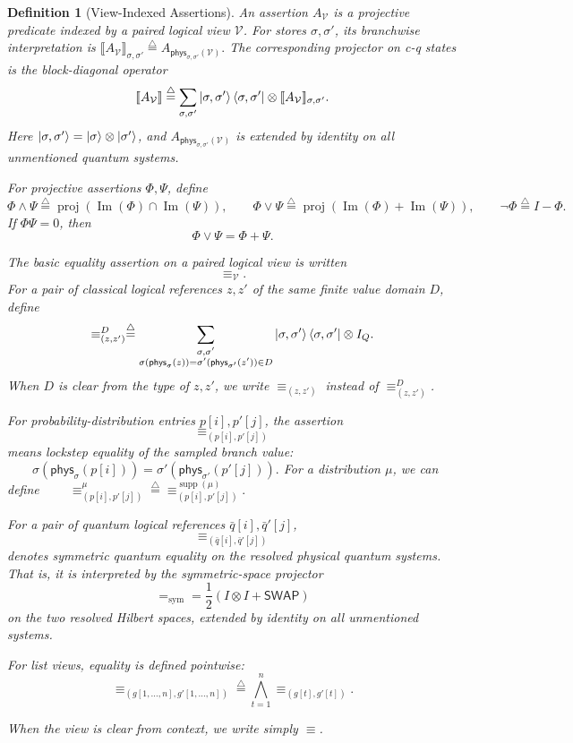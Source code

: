 \documentclass[acmsmall,screen,review,anonymous,nonacm]{acmart}
\newtheorem{definition}{Definition}[section]
\theoremstyle{defn_style}
\begin{document}
\begin{definition}[View-Indexed Assertions]
An assertion \(A_{\mathcal V}\) is a projective predicate indexed by a paired
logical view \(\mathcal V\). For stores \(\sigma,\sigma'\), its branchwise
interpretation is
\(\llbracket A_{\mathcal V}\rrbracket_{\sigma,\sigma'}
\stackrel{\triangle}{=}
A_{\mathsf{phys}_{\sigma,\sigma'}(\mathcal V)}.\)
The corresponding projector on c-q states is the block-diagonal operator
\[
\llbracket A_{\mathcal V}\rrbracket
\stackrel{\triangle}{=}
\sum_{\sigma,\sigma'}
\ket{\sigma,\sigma'}\bra{\sigma,\sigma'}
\otimes
\llbracket A_{\mathcal V}\rrbracket_{\sigma,\sigma'}.
\]
Here
\(\ket{\sigma,\sigma'}=\ket{\sigma}\otimes\ket{\sigma'}\), and
\(A_{\mathsf{phys}_{\sigma,\sigma'}(\mathcal V)}\) is extended by identity
on all unmentioned quantum systems.

For projective assertions \(\Phi,\Psi\), define
\[
\Phi\land\Psi
\stackrel{\triangle}{=}
\operatorname{proj}
\left(
\operatorname{Im}(\Phi)\cap\operatorname{Im}(\Psi)
\right),
\qquad
\Phi\lor\Psi
\stackrel{\triangle}{=}
\operatorname{proj}
\left(
\operatorname{Im}(\Phi)+\operatorname{Im}(\Psi)
\right),
\qquad
\neg\Phi\stackrel{\triangle}{=}I-\Phi.
\]
If \(\Phi\Psi=0\), then
\[
\Phi\lor\Psi=\Phi+\Psi.
\]

The basic equality assertion on a paired logical view is written
\[
\equiv_{\mathcal V}.
\]
For a pair of classical logical references \(z,z'\) of the same finite value
domain \(D\), define
\[
\equiv^{D}_{(z,z')}
\stackrel{\triangle}{=}
\sum_{\substack{\sigma,\sigma'\\
\sigma(\mathsf{phys}_{\sigma}(z))
=
\sigma'(\mathsf{phys}_{\sigma'}(z'))\in D}}
\ket{\sigma,\sigma'}\bra{\sigma,\sigma'}
\otimes I_Q .
\]
When \(D\) is clear from the type of \(z,z'\), we write
\(\equiv_{(z,z')}\)
instead of \(\equiv^{D}_{(z,z')}\).

For probability-distribution entries \(p[i],p'[j]\), the assertion
\[
\equiv_{(p[i],p'[j])}
\]
means lockstep equality of the sampled branch value:
\(\qquad\sigma(\mathsf{phys}_{\sigma}(p[i]))
=
\sigma'(\mathsf{phys}_{\sigma'}(p'[j])).\)
For a distribution \(\mu\), we can define
\(\qquad\equiv^{\mu}_{(p[i],p'[j])}
\stackrel{\triangle}{=}
\equiv^{\operatorname{supp}(\mu)}_{(p[i],p'[j])}.\)

For a pair of quantum logical references \(\bar q[i],\bar q'[j]\),
\[
\equiv_{(\bar q[i],\bar q'[j])}
\]
denotes symmetric quantum equality on the resolved physical quantum systems.
That is, it is interpreted by the symmetric-space projector
\[
=_{\mathrm{sym}}
=
\frac{1}{2}(I\otimes I+\mathsf{SWAP})
\]
on the two resolved Hilbert spaces, extended by identity on all unmentioned
systems.

For list views, equality is defined pointwise:
\[
\equiv_{(g[1,\ldots,n],g'[1,\ldots,n])}
\stackrel{\triangle}{=}
\bigwedge_{t=1}^{n}
\equiv_{(g[t],g'[t])}.
\]

When the view is clear from context, we write simply \(\equiv\).
\end{definition}
\end{document}
